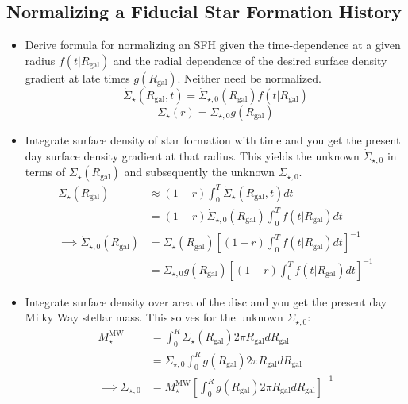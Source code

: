 \documentclass[fleqn, usenatbib]{mnras}
\begin{document}
\newpage 
\begin{appendices} 

\section{Normalizing a Fiducial Star Formation History} 
\label{sec:normalize_sfh} 
\begin{itemize} 
	\item Derive formula for normalizing an SFH given the time-dependence at 
	a given radius $f(t|R_\text{gal})$ and the radial dependence of the 
	desired surface density gradient at late times $g(R_\text{gal})$. Neither 
	need be normalized. 
	\begin{equation} 
	\dot{\Sigma}_\star(R_\text{gal}, t) = \dot{\Sigma}_{\star,0}(R_\text{gal}) 
	f(t|R_\text{gal}) 
	\end{equation} 
	\begin{equation} 
	\Sigma_\star(r) = \Sigma_{\star,0} g(R_\text{gal}) 
	\end{equation} 

	\item Integrate surface density of star formation with time and you get 
	the present day surface density gradient at that radius. This yields the 
	unknown $\dot{\Sigma}_{\star,0}$ in terms of $\Sigma_\star(R_\text{gal})$ 
	and subsequently the unknown $\Sigma_{\star,0}$. 
	\begin{subequations}\begin{align} 
	\Sigma_\star(R_\text{gal}) 
	&\approx (1 - r) \int_0^T \dot{\Sigma}_\star(R_\text{gal}, t) dt \\ 
	&= (1 - r) \dot{\Sigma}_{\star,0}(R_\text{gal}) \int_0^T f(t|R_\text{gal}) 
	dt \\ 
	\implies \dot{\Sigma}_{\star,0}(R_\text{gal}) &= 
	\Sigma_\star(R_\text{gal}) \left[(1 - r)\int_0^T f(t|R_\text{gal}) dt
	\right]^{-1} \\ 
	&= \Sigma_{\star,0}g(R_\text{gal}) \left[(1 - r) \int_0^T f(t|R_\text{gal}) 
	dt\right]^{-1} 
	\end{align}\end{subequations} 

	\item Integrate surface density over area of the disc and you get the 
	present day Milky Way stellar mass. This solves for the unknown 
	$\Sigma_{\star,0}$: 
	\begin{subequations}\begin{align} 
	M_\star^\text{MW} &= \int_0^R \Sigma_\star(R_\text{gal}) 2\pi R_\text{gal} 
	dR_\text{gal} \\ 
	&= \Sigma_{\star,0}\int_0^R g(R_\text{gal}) 2\pi R_\text{gal} dR_\text{gal} 
	\\ 
	\implies \Sigma_{\star,0} &= M_\star^\text{MW} 
	\left[\int_0^R g(R_\text{gal}) 2\pi R_\text{gal}dR_\text{gal}\right]^{-1} 
	\end{align}\end{subequations} 


\end{itemize}
\end{appendices}
\end{document}
